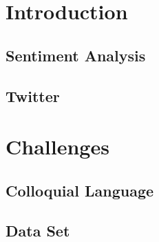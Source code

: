 \documentclass[10pt]{article}
\begin{document}



\tableofcontents
\newpage

\abstract{
} \newpage

\section{Introduction}

\subsection{Sentiment Analysis}

\subsection{Twitter}


\section{Challenges}

\subsection{Colloquial Language}

\subsection{Data Set}
\end{document}
